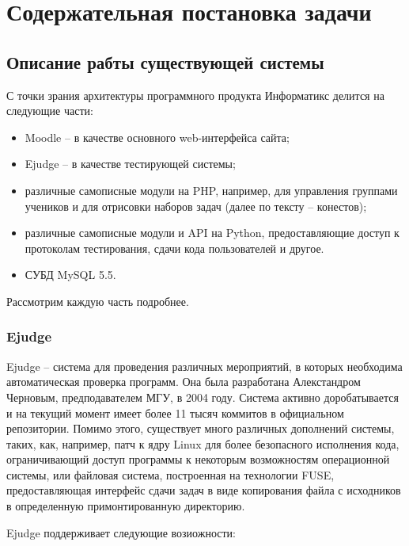 \chapter{Содержательная постановка задачи}

\section{Описание рабты существующей системы}

С точки зрания архитектуры программного продукта Информатикс делится на следующие части:

\begin{itemize}
    \item Moodle -- в качестве основного web-интерфейса сайта;
    \item Ejudge -- в качестве тестирующей системы;
    \item различные самописные модули на PHP, например, для управления группами учеников и для отрисовки наборов задач (далее по тексту -- конестов);
    \item различные самописные модули и API на Python, предоставляющие доступ к протоколам тестирования, сдачи кода пользователей и другое.
    \item СУБД MySQL 5.5.
\end{itemize}

Рассмотрим каждую часть подробнее.

\subsection{Ejudge}

Ejudge -- система для проведения различных мероприятий, в которых необходима автоматическая проверка программ. 
Она была разработана Алекстандром Черновым, предподавателем МГУ, в 2004 году. 
Система активно доробатывается и на текущий момент имеет более 11 тысяч коммитов в официальном репозитории.
Помимо этого, существует много различных дополнений системы, таких, как, например, 
патч к ядру Linux для более безопасного исполнения кода, ограничивающий доступ программы к некоторым возможностям операционной системы,
или файловая система, построенная на технологии FUSE, предоставляющая интерфейс сдачи задач в виде копирования файла с исходников в определенную примонтированную директорию.

Ejudge поддерживает следующие возиожности:

